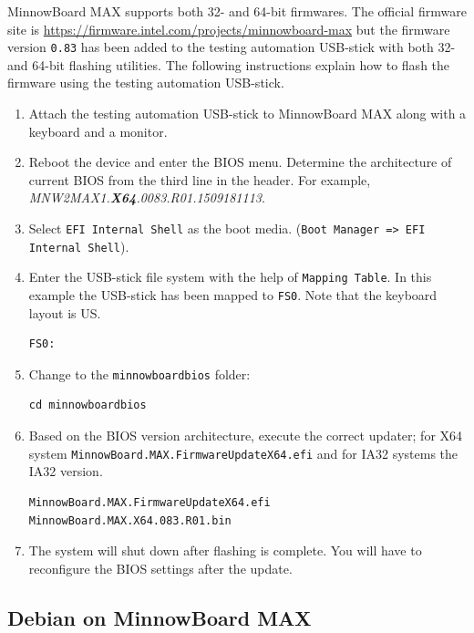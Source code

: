 \documentclass[a4paper,11pt]{article}
\newcommand{\cmd}[1]{\texttt{#1}}
\begin{document}
MinnowBoard MAX supports both 32- and 64-bit firmwares. The official firmware site is \url{https://firmware.intel.com/projects/minnowboard-max} but the firmware version \cmd{0.83} has been added to the testing automation USB-stick with both 32- and 64-bit flashing utilities. The following instructions explain how to flash the firmware using the testing automation USB-stick.

\begin{enumerate}
\item Attach the testing automation USB-stick to MinnowBoard MAX along with a keyboard and a monitor.

\item Reboot the device and enter the BIOS menu. Determine the architecture of current BIOS from the third line in the header. For example, \textit{MNW2MAX1.\textbf{X64}.0083.R01.1509181113}.

\item Select \cmd{EFI Internal Shell} as the boot media. (\cmd{Boot Manager => EFI Internal Shell}).

\item Enter the USB-stick file system with the help of \cmd{Mapping Table}. In this example the USB-stick has been mapped to \cmd{FS0}. Note that the keyboard layout is US.
\begin{lstlisting}
FS0:
\end{lstlisting}

\item Change to the \cmd{minnowboardbios} folder:
\begin{lstlisting}
cd minnowboardbios
\end{lstlisting}

\item Based on the BIOS version architecture, execute the correct updater; for X64 system \cmd{MinnowBoard.MAX.FirmwareUpdateX64.efi} and for IA32 systems the IA32 version.
\begin{lstlisting}
MinnowBoard.MAX.FirmwareUpdateX64.efi MinnowBoard.MAX.X64.083.R01.bin
\end{lstlisting}

\item The system will shut down after flashing is complete. You will have to reconfigure the BIOS settings after the update.
\end{enumerate}

\subsection{Debian on MinnowBoard MAX}
\label{minnowdebian}
\end{document}
